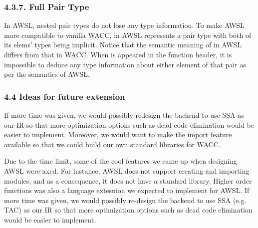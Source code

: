 \documentclass[10pt,a4paper]{report}
\begin{document}
  \subsubsection*{4.3.7. Full Pair Type}
  In AWSL, nested pair types do not lose any type information. To make AWSL more
  compatible to vanilla WACC,  in AWSL represents a pair type with
  both of its elems' types being implicit. Notice that the semantic meaning of
   in AWSL differs from that in WACC. When  is
  appeared in the function header, it is impossible to deduce any type
  information about either element of that pair as per the semantics of AWSL.

  \subsubsection*{4.4 Ideas for future extension}
  If more time was given, we would possibly redesign the backend to use SSA as
  our IR so that more optimization options such as dead code elimination would
  be easier to implement. Moreover, we would want to make the import feature
  available so that we could build our own standard libraries for WACC.

  Due to the time limit, some of the cool features we came up when designing
  AWSL were axed. For instance, AWSL does not support creating and importing
  modules, and as a consequence, it does not have a standard library. Higher
  order functions was also a language extesnion we expected to implement for
  AWSL. If more time was given, we would possibly re-design the backend to use
  SSA (e.g. TAC) as our IR so that more optimization options such as dead code
  elimination would be easier to implement.
  
\end{document}
